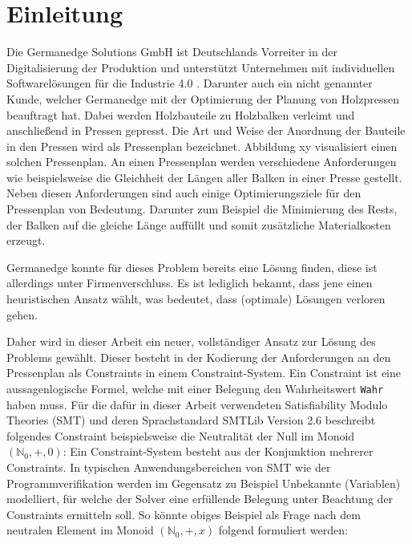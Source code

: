 \chapter{Einleitung}
\label{chapter:Einleitung}

Die Germanedge Solutions GmbH ist Deutschlands Vorreiter in der Digitalisierung der Produktion und
unterstützt Unternehmen mit individuellen Softwarelösungen für die Industrie 4.0 \cite{industry4dot0}.
Darunter auch ein nicht genannter Kunde, welcher Germanedge mit der Optimierung der Planung von Holzpressen beauftragt hat.
Dabei werden Holzbauteile zu Holzbalken verleimt und anschließend in Pressen gepresst.
Die Art und Weise der Anordnung der Bauteile in den Pressen wird als Pressenplan bezeichnet.
Abbildung xy visualisiert einen solchen Pressenplan. %
An einen Pressenplan werden verschiedene Anforderungen wie beispielsweise die Gleichheit der Längen aller Balken in einer Presse gestellt.
Neben diesen Anforderungen sind auch einige Optimierungsziele für den Pressenplan von Bedeutung.
Darunter zum Beispiel die Minimierung des Rests, der Balken auf die gleiche Länge auffüllt und somit zusätzliche Materialkosten erzeugt.

Germanedge konnte für dieses Problem bereits eine Lösung finden, diese ist allerdings unter Firmenverschluss.
Es ist lediglich bekannt, dass jene einen heuristischen Ansatz wählt, was bedeutet, dass (optimale) Lösungen verloren gehen.

Daher wird in dieser Arbeit ein neuer, vollständiger Ansatz zur Lösung des Problems gewählt.
Dieser besteht in der Kodierung der Anforderungen an den Pressenplan als Constraints in einem Constraint-System.
Ein Constraint ist eine aussagenlogische Formel, welche mit einer Belegung den Wahrheitswert \texttt{Wahr} haben muss.
Für die dafür in dieser Arbeit verwendeten Satisfiability Modulo Theories (SMT) und deren Sprachstandard SMTLib Version 2.6 \cite{smtlib}
beschreibt folgendes Constraint beispielsweise die Neutralität der Null im Monoid $(\mathbb{N}_0, +, 0)$: %
Ein Constraint-System besteht aus der Konjunktion mehrerer Constraints.
In typischen Anwendungsbereichen von SMT wie der Programmverifikation \cite{smt} werden im Gegensatz zu Beispiel %
Unbekannte (Variablen) modelliert, für welche der Solver eine erfüllende Belegung unter Beachtung der Constraints ermitteln soll.
So könnte obiges Beispiel als Frage nach dem neutralen Element im Monoid $(\mathbb{N}_0, +, x)$ folgend formuliert werden: %

